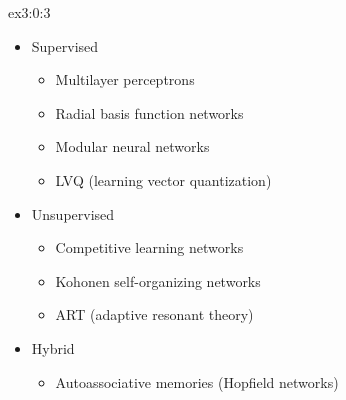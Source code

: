\documentclass{tron}
\begin{document}
\begin{example}{ex3:0:3}
	\vspace{-5pt}
	\begin{itemize}
		\item Supervised
			\vspace{-5pt}
			\begin{itemize}
				\item Multilayer perceptrons
				\item Radial basis function networks
				\item Modular neural networks 
				\item LVQ (learning vector quantization)
			\end{itemize}
		\item Unsupervised
			\vspace{-5pt}
			\begin{itemize}
				\item Competitive learning networks
				\item Kohonen self-organizing networks
				\item ART (adaptive resonant theory)
			\end{itemize}
		\item Hybrid
			\vspace{-5pt}
			\begin{itemize}
				\item Autoassociative memories (Hopﬁeld networks)
			\end{itemize}
	\end{itemize}
\end{example}
\end{document}

